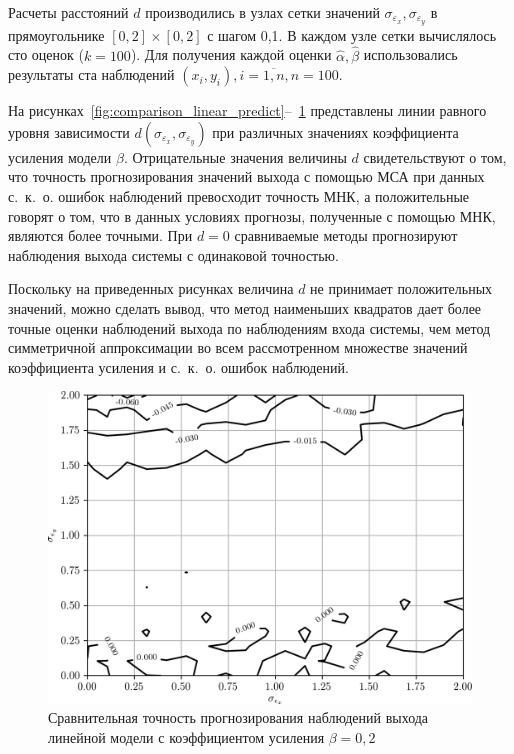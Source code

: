 Расчеты расстояний \( d \) производились в узлах сетки значений
\( \sigma_{\varepsilon_x}, \sigma_{\varepsilon_y} \) в прямоугольнике
\( [0, 2] \times [0, 2] \) с шагом 0{,}1.
В каждом узле сетки вычислялось сто оценок (\( k = 100 \)).
Для получения каждой оценки \( \hat{\alpha}, \hat{\beta} \) использовались результаты
ста наблюдений \( ( x_i, y_i ), i = \overline{1, n}, n = 100 \).

На рисунках~\ref{fig:comparison_linear_predict}--~\ref{fig:comparison_linear_predict_beta-0,2}
представлены линии равного уровня зависимости \( d(\sigma_{\varepsilon_x}, \sigma_{\varepsilon_y}) \)
при различных значениях коэффициента усиления модели \( \beta \).
Отрицательные значения величины \( d \) свидетельствуют о том,
что точность прогнозирования значений выхода с помощью МСА при данных с.~к.~о.
ошибок наблюдений превосходит точность МНК,
а положительные говорят о том, что в данных условиях прогнозы, полученные с помощью МНК,
являются более точными.
При \( d = 0 \) сравниваемые методы прогнозируют наблюдения выхода системы с
одинаковой точностью.

Поскольку на приведенных рисунках величина \( d \) не принимает положительных значений,
можно сделать вывод, что метод наименьших квадратов дает более точные оценки
наблюдений выхода по наблюдениям входа системы, чем метод симметричной аппроксимации
во всем рассмотренном множестве значений коэффициента усиления и с.~к.~о. ошибок наблюдений.

\begin{figure}[h]
  \centering
  \includegraphics[width=135mm]{fig/linear/predict/beta-0,2_predict-measured.png}
  \caption{%
    Сравнительная точность прогнозирования наблюдений выхода \\
    линейной модели с коэффициентом усиления \( \beta = 0{,}2 \)
  }\label{fig:comparison_linear_predict_beta-0,2}
\end{figure}

